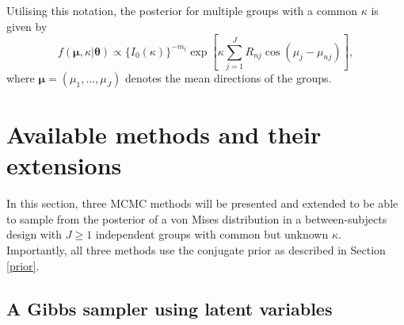\documentclass[bib]{ba/ba}
\begin{document}
Utilising this notation, the posterior for multiple groups with a common $\kappa$ is given by $$f(\boldsymbol{\mu}, \kappa \vert \boldsymbol\theta) \propto \{I_0 (\kappa) \}^{-m_t} \exp \left[ \kappa \sum_{j=1}^{J} R_{nj} \cos (\mu_j - \mu_{nj})\right], $$ where $\boldsymbol{\mu} = (\mu_{1}, \dots, \mu_{J})$ denotes the mean directions of the groups. 


\section{Available methods and their extensions \label{methods}}

In this section, three MCMC methods will be presented and extended to be able to sample from the posterior of a von Mises distribution in a between-subjects design with $J \geq 1$ independent groups with common but unknown $\kappa$. Importantly, all three methods use the conjugate prior as described in Section \ref{prior}. %


\subsection{A Gibbs sampler using latent variables  \label{dw}}
\end{document}
